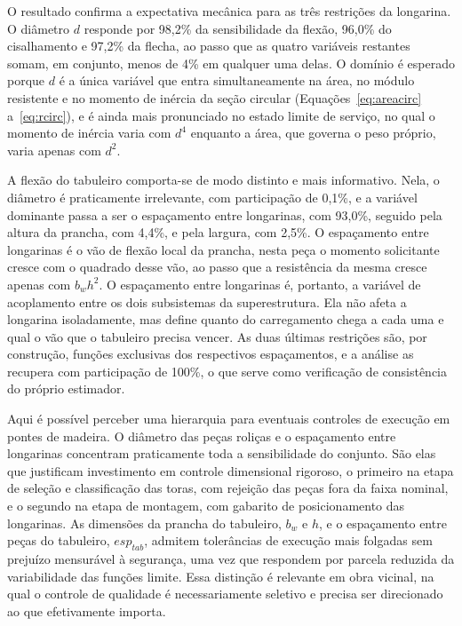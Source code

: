 O resultado confirma a expectativa mecânica para as três restrições da longarina.
O diâmetro $d$ responde por 98{,}2\% da sensibilidade da flexão, 96{,}0\% do cisalhamento e 97{,}2\% da flecha, ao passo que as quatro variáveis restantes somam, em conjunto, menos de 4\% em qualquer uma delas.
O domínio é esperado porque $d$ é a única variável que entra simultaneamente na área, no módulo resistente e no momento de inércia da seção circular (Equações~\eqref{eq:areacirc} a~\eqref{eq:rcirc}), e é ainda mais pronunciado no estado limite de serviço, no qual o momento de inércia varia com $d^4$ enquanto a área, que governa o peso próprio, varia apenas com $d^2$.

A flexão do tabuleiro comporta-se de modo distinto e mais informativo.
Nela, o diâmetro é praticamente irrelevante, com participação de 0{,}1\%, e a variável dominante passa a ser o espaçamento entre longarinas, com 93{,}0\%, seguido pela altura da prancha, com 4{,}4\%, e pela largura, com 2{,}5\%.
O espaçamento entre longarinas é o vão de flexão local da prancha, nesta peça o momento solicitante cresce com o quadrado desse vão, ao passo que a resistência da mesma cresce apenas com $b_w h^2$.
O espaçamento entre longarinas é, portanto, a variável de acoplamento entre os dois subsistemas da superestrutura. Ela não afeta a longarina isoladamente, mas define quanto do carregamento chega a cada uma e qual o vão que o tabuleiro precisa vencer.
As duas últimas restrições são, por construção, funções exclusivas dos respectivos espaçamentos, e a análise as recupera com participação de 100\%, o que serve como verificação de consistência do próprio estimador.

Aqui é possível perceber uma hierarquia para eventuais controles de execução em pontes de madeira.
O diâmetro das peças roliças e o espaçamento entre longarinas concentram praticamente toda a sensibilidade do conjunto.
São elas que justificam investimento em controle dimensional rigoroso, o primeiro na etapa de seleção e classificação das toras, com rejeição das peças fora da faixa nominal, e o segundo na etapa de montagem, com gabarito de posicionamento das longarinas.
As dimensões da prancha do tabuleiro, $b_w$ e $h$, e o espaçamento entre peças do tabuleiro, $esp_{tab}$, admitem tolerâncias de execução mais folgadas sem prejuízo mensurável à segurança, uma vez que respondem por parcela reduzida da variabilidade das funções limite.
Essa distinção é relevante em obra vicinal, na qual o controle de qualidade é necessariamente seletivo e precisa ser direcionado ao que efetivamente importa.

